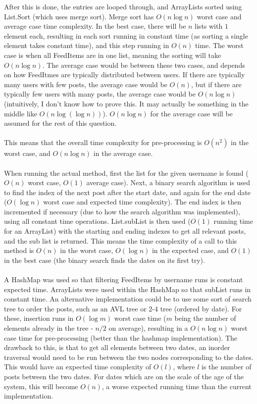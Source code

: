 \documentclass{article}
\begin{document}
	After this is done, the entries are looped through, and ArrayLists sorted using List.Sort (which uses merge sort). Merge sort has $O(n \log n)$ worst case and average case time complexity. In the best case, there will be $n$ lists with $1$ element each, resulting in each sort running in constant time (as sorting a single element takes constant time), and this step running in $O(n)$ time. The worst case is when all FeedItems are in one list, meaning the sorting will take $O(n \log n)$. The average case would be between these two cases, and depends on how FeedItmes are typically distributed between users. If there are typically many users with few posts, the average case would be $O(n)$, but if there are typically few users with many posts, the average case would be $O(n \log n)$ (intuitively, I don't know how to prove this. It may actually be something in the middle like $O(n \log ( \log n))$). $O(n \log n)$ for the average case will be assumed for the rest of this question. \\ \\
	This means that the overall time complexity for pre-processing is $O(n^2)$ in the worst case, and $O(n \log n)$ in the average case. \\ \\
	When running the actual method, first the list for the given username is found ($O(n)$ worst case, $O(1)$ average case). Next, a binary search algorithm is used to find the index of the next post after the start date, and again for the end date ($O(\log n)$ worst case and expected time complexity). The end index is then incremented if necessary (due to how the search algorithm was implemented), using all constant time operations. List.subList is then used ($O(1)$ running time for an ArrayList) with the starting and ending indexes to get all relevant posts, and the sub list is returned. This means the time complexity of a call to this method is $O(n)$ in the worst case, $O(\log n)$ in the expected case, and $O(1)$ in the best case (the binary search finds the dates on its first try). \\ \\	
	A HashMap was used so that filtering FeedItems by username runs is constant expected time. ArrayLists were used within the HashMap so that subList runs in constant time. An alternative implementation could be to use some sort of search tree to order the posts, such as an AVL tree or 2-4 tree (ordered by date). For these, insertion runs in $O(\log m)$ worst case time ($m$ being the number of elements already in the tree - $n/2$ on average), resulting in a $O(n \log n)$ worst case time for pre-processing (better than the hashmap implementation). The drawback to this, is that to get all elements between two dates, an inorder traversal would need to be run between the two nodes corresponding to the dates. This would have an expected time complexity of $O(l)$, where $l$ is the number of posts between the two dates. For dates which are on the scale of the age of the system, this will become $O(n)$, a worse expected running time than the current implementation.
\end{document}
